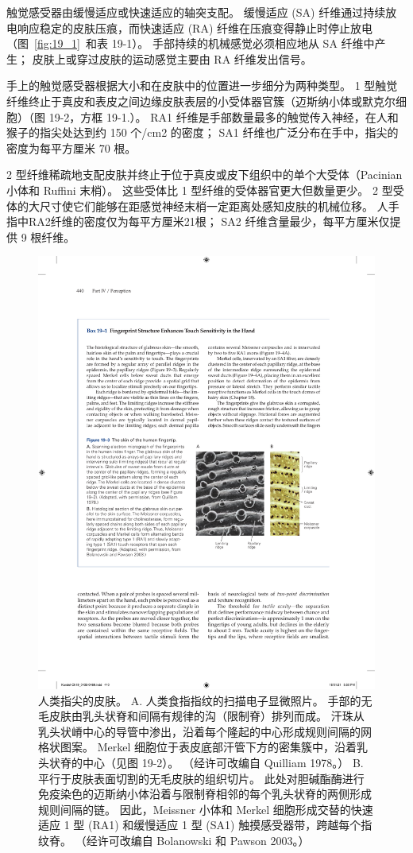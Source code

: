 触觉感受器由缓慢适应或快速适应的轴突支配。
缓慢适应 (SA) 纤维通过持续放电响应稳定的皮肤压痕，而快速适应 (RA) 纤维在压痕变得静止时停止放电（图~\ref{fig:19_1}~和表 19-1）。
手部持续的机械感觉必须相应地从 SA 纤维中产生；
皮肤上或穿过皮肤的运动感觉主要由 RA 纤维发出信号。


手上的触觉感受器根据大小和在皮肤中的位置进一步细分为两种类型。
1 型触觉纤维终止于真皮和表皮之间边缘皮肤表层的小受体器官簇（迈斯纳小体或默克尔细胞）（图 19-2，方框 19-1.）。
RA1 纤维是手部数量最多的触觉传入神经，在人和猴子的指尖处达到约 150 个/cm2 的密度；
SA1 纤维也广泛分布在手中，指尖的密度为每平方厘米 70 根。


2 型纤维稀疏地支配皮肤并终止于位于真皮或皮下组织中的单个大受体（Pacinian 小体和 Ruffini 末梢）。 
这些受体比 1 型纤维的受体器官更大但数量更少。
2 型受体的大尺寸使它们能够在距感觉神经末梢一定距离处感知皮肤的机械位移。
人手指中RA2纤维的密度仅为每平方厘米21根；
SA2 纤维含量最少，每平方厘米仅提供 9 根纤维。


\begin{figure}[htbp]
	\centering
	\includegraphics[width=0.5\linewidth]{chap19/fig_19_3}
	\caption{人类指尖的皮肤。
		A. 人类食指指纹的扫描电子显微照片。
		手部的无毛皮肤由乳头状脊和间隔有规律的沟（限制脊）排列而成。
		汗珠从乳头状嵴中心的导管中渗出，沿着每个隆起的中心形成规则间隔的网格状图案。
		Merkel 细胞位于表皮底部汗管下方的密集簇中，沿着乳头状脊的中心（见图 19-2）。
		 （经许可改编自 Quilliam 1978。）
		 B. 平行于皮肤表面切割的无毛皮肤的组织切片。 此处对胆碱酯酶进行免疫染色的迈斯纳小体沿着与限制脊相邻的每个乳头状脊的两侧形成规则间隔的链。
		 因此，Meissner 小体和 Merkel 细胞形成交替的快速适应 1 型 (RA1) 和缓慢适应 1 型 (SA1) 触摸感受器带，跨越每个指纹脊。 （经许可改编自 Bolanowski 和 Pawson 2003。）}
	\label{fig:19_3}
\end{figure}



